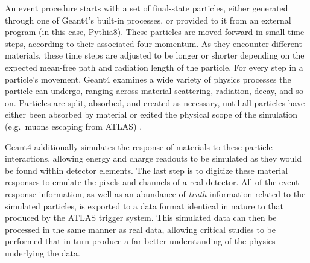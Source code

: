     An event procedure starts with a set of final-state particles,
        either generated through one of Geant4's built-in processes,
        or provided to it from an external program (in this case, Pythia8).
    These particles are moved forward in small time steps, according to their associated four-momentum.
    As they encounter different materials,
        these time steps are adjusted to be longer or shorter depending on
        the expected mean-free path and radiation length of the particle.
    For every step in a particle's movement,
        Geant4 examines a wide variety of physics processes the particle can undergo,
        ranging across material scattering, radiation, decay, and so on.
    Particles are split, absorbed, and created as necessary,
        until all particles have either been absorbed by material
        or exited the physical scope of the simulation (e.g.\ muons escaping from ATLAS) \cite{geant4}.

    Geant4 additionally simulates the response of materials to these particle interactions,
        allowing energy and charge readouts to be simulated as they would be found within detector elements.
    The last step is to digitize these material responses to emulate the pixels and channels of a real detector.
    All of the event response information, as well as an abundance of \textit{truth} information related to the simulated particles,
        is exported to a data format identical in nature to that produced by the ATLAS trigger system.
    This simulated data can then be processed in the same manner as real data,
        allowing critical studies to be performed that in turn produce
        a far better understanding of the physics underlying the data.




